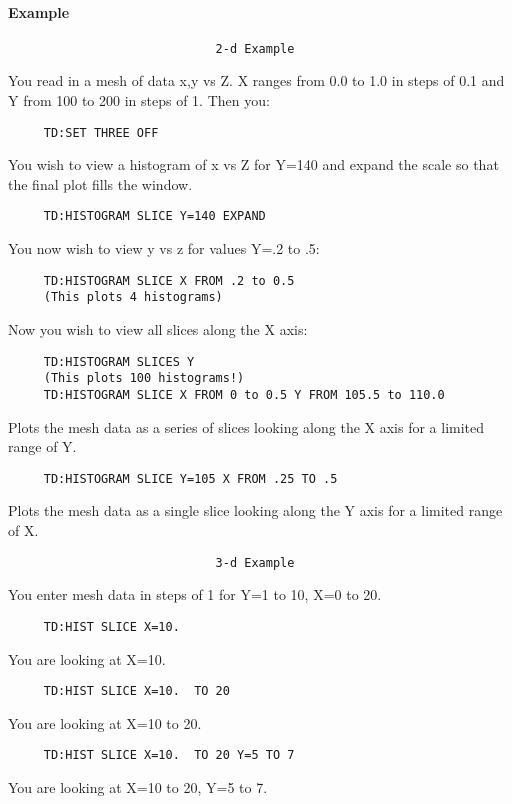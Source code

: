 \paragraph{Example}
\begin{verbatim}
                             2-d Example
\end{verbatim}
You  read  in  a  mesh of data x,y vs Z.  X ranges from 0.0 to 1.0 in
steps of 0.1 and Y from 100 to 200 in steps of 1.  Then you:  
\begin{verbatim}
     TD:SET THREE OFF 
\end{verbatim}
You wish to view a histogram of x vs Z for Y=140 and expand the scale
so that the final plot fills the window.  
\begin{verbatim}
     TD:HISTOGRAM SLICE Y=140 EXPAND 
\end{verbatim}

You now wish to view y vs z for values Y=.2 to .5:  
\begin{verbatim}
     TD:HISTOGRAM SLICE X FROM .2 to 0.5 
     (This plots 4 histograms) 
\end{verbatim}

Now you wish to view all slices along the X axis:  
\begin{verbatim}
     TD:HISTOGRAM SLICES Y 
     (This plots 100 histograms!) 
     TD:HISTOGRAM SLICE X FROM 0 to 0.5 Y FROM 105.5 to 110.0 
\end{verbatim}
Plots  the  mesh  data as a series of slices looking along the X axis
for a limited range of Y.  
\begin{verbatim}
     TD:HISTOGRAM SLICE Y=105 X FROM .25 TO .5 
\end{verbatim}
Plots  the mesh data as a single slice looking along the Y axis for a
limited range of X.  

\begin{verbatim}
                             3-d Example
\end{verbatim}
You enter mesh data in steps of 1 for Y=1 to 10, X=0 to 20.  
\begin{verbatim}
     TD:HIST SLICE X=10.  
\end{verbatim}
You are looking at X=10.  
\begin{verbatim}
     TD:HIST SLICE X=10.  TO 20 
\end{verbatim}
You are looking at X=10 to 20.  
\begin{verbatim}
     TD:HIST SLICE X=10.  TO 20 Y=5 TO 7 
\end{verbatim}
You are looking at X=10 to 20, Y=5 to 7.  
